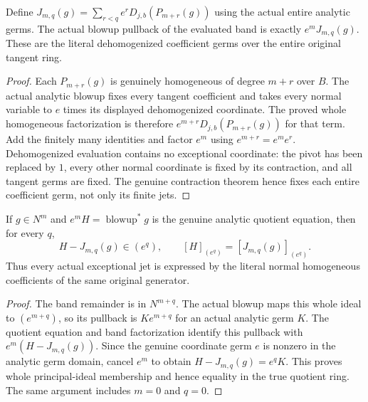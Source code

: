 \begin{theorem}
\label{hir:actual-weighted-transform-band-factorization}
\leanok
Define $J_{m,q}(g)=\sum_{r<q}e^rD_{j,b}(P_{m+r}(g))$ using the actual entire analytic germs.
The actual blowup pullback of the evaluated band is exactly $e^mJ_{m,q}(g)$.
These are the literal dehomogenized coefficient germs over the entire original tangent ring.
\end{theorem}
\begin{proof}
Each $P_{m+r}(g)$ is genuinely homogeneous of degree $m+r$ over $B$.
The actual analytic blowup fixes every tangent coefficient and takes every normal variable to $e$ times its displayed dehomogenized coordinate.
The proved whole homogeneous factorization is therefore $e^{m+r}D_{j,b}(P_{m+r}(g))$ for that term.
Add the finitely many identities and factor $e^m$ using $e^{m+r}=e^me^r$.
Dehomogenized evaluation contains no exceptional coordinate: the pivot has been replaced by $1$, every other normal coordinate is fixed by its contraction, and all tangent germs are fixed.
The genuine contraction theorem hence fixes each entire coefficient germ, not only its finite jets.
\end{proof}

\begin{theorem}
\label{hir:actual-weighted-transform-all-exceptional-jets}
\leanok
If $g\in N^m$ and $e^mH=\operatorname{blowup}^*g$ is the genuine analytic quotient equation, then for every $q$,
\[
 H-J_{m,q}(g)\in(e^q),\qquad [H]_{(e^q)}=[J_{m,q}(g)]_{(e^q)}.
\]
Thus every actual exceptional jet is expressed by the literal normal homogeneous coefficients of the same original generator.
\end{theorem}
\begin{proof}
The band remainder is in $N^{m+q}$.
The actual blowup maps this whole ideal to $(e^{m+q})$, so its pullback is $Ke^{m+q}$ for an actual analytic germ $K$.
The quotient equation and band factorization identify this pullback with $e^m(H-J_{m,q}(g))$.
Since the genuine coordinate germ $e$ is nonzero in the analytic germ domain, cancel $e^m$ to obtain $H-J_{m,q}(g)=e^qK$.
This proves whole principal-ideal membership and hence equality in the true quotient ring.
The same argument includes $m=0$ and $q=0$.
\end{proof}

